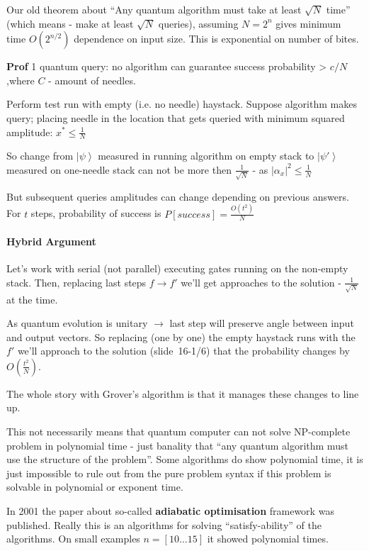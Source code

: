 \documentclass{scrartcl}
\newcommand{\ket}[1]{\left| #1 \right>} %
\newcommand{\slide}[2]{slide~#1/#2} %
\begin{document}
Our old theorem about ``Any quantum algorithm must take at least $\sqrt N$ time''
(which means - make at least $\sqrt N$ queries), assuming $N=2^n$ gives minimum
time $O(2^{n/2})$ dependence on input size. This is exponential on number of
bites. 

{\bf Prof} 1 quantum query: no algorithm can guarantee success probability >
$c/N$,where $C$ - amount of needles. 

Perform test run with empty (i.e. no needle) haystack. Suppose algorithm makes
query; placing needle in the location that gets queried with minimum squared
amplitude: $x^* \leq \frac1N$

So change from $\ket \psi$ measured in running algorithm on empty stack to $\ket
{\psi'}$  measured on one-needle stack can not be more then $\frac1{\sqrt N}$ -
as $|\alpha_x|^2 \leq \frac1N$

But subsequent queries amplitudes can change depending on previous answers. For
$t$ steps, probability of success is $P[success] = \frac{O(t^2)}N$

\paragraph{Hybrid Argument}

Let's work with serial (not parallel) executing gates running on the non-empty
stack. Then, replacing last steps $f \to f'$ we'll get approaches to the
solution - $\frac1{\sqrt N}$ at the time.

As quantum evolution is unitary $\to$ last step will preserve angle between
input and output vectors. So replacing (one by one) the empty haystack runs with
the $f'$ we'll approach to the solution (\slide{16-1}6) that the probability
changes by $O(\frac{t^2}N)$.

The whole story with Grover's algorithm is that it manages these changes to line
up. 

This not necessarily means that quantum computer can not solve NP-complete
problem in polynomial time - just banality that ``any quantum algorithm must use
the structure of the problem''. Some algorithms do show polynomial time, it is
just impossible to rule out from the pure problem syntax if this problem is
solvable in polynomial or exponent time. 

In 2001 the paper about so-called {\bf adiabatic optimisation} framework was
published. Really this is an algorithms for solving ``satisfy-ability'' of the
algorithms. On small examples $n=[10 \dots 15]$ it showed polynomial times.
\end{document}
